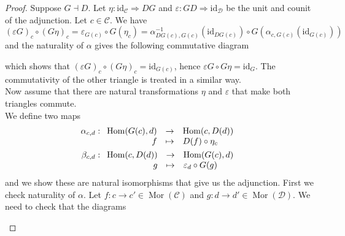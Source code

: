 \documentclass{article}
\newcommand{\id}{\mathrm{id}}
\newcommand{\cat}{\mathcal{C}}
\newcommand{\catt}{\mathcal{D}}
\DeclareMathOperator{\Mor}{Mor}
\DeclareMathOperator{\Hom}{Hom}
\renewcommand{\epsilon}{\varepsilon}
\newcommand{\applic}[4]{\begin{array}[t]{rcl}
#1 & \to & #2 \\
#3 & \mapsto & #4
\end{array}}
\theoremstyle{plain}
\theoremstyle{definition}
\theoremstyle{remark}
\begin{document}
\begin{proof}
    Suppose $G \dashv D$. Let $\eta : \id_\cat \Rightarrow DG$ and $\epsilon : GD \Rightarrow \id_\catt$ be the unit and counit of the adjunction. Let $c \in \cat$. We have
    \[(\epsilon G)_c \circ (G\eta)_c = \varepsilon_{G(c)} \circ G(\eta_c) = \alpha_{DG(c),G(c)}^{-1} (\id_{DG(c)}) \circ G(\alpha_{c,G(c)}(\id_{G(c)}))\]
    and the naturality of $\alpha$ gives the following commutative diagram
    \begin{center}
    \end{center}
    which shows that $(\epsilon G)_c \circ (G\eta)_c = \id_{G(c)}$, hence $\epsilon G \circ G\eta = \id_G$. The commutativity of the other triangle is treated in a similar way. \\
    Now assume that there are natural transformations $\eta$ and $\epsilon$ that make both triangles commute. \\
    We define two maps
    \begin{align*}
        \alpha_{c,d} & : \applic{\Hom(G(c),d)}{\Hom(c,D(d))}{f}{D(f)\circ \eta_c} \\
        \beta_{c,d} & : \applic{\Hom(c,D(d))}{\Hom(G(c),d)}{g}{\epsilon_d \circ G(g)}
    \end{align*}
    and we show these are natural isomorphisms that give us the adjunction. First we check naturality of $\alpha$. Let $f : c \to c' \in \Mor(\cat)$ and $g : d\to d' \in \Mor(\catt)$. We need to check that the diagrams
    \begin{center}
\end{center}
\end{proof}
\end{document}
